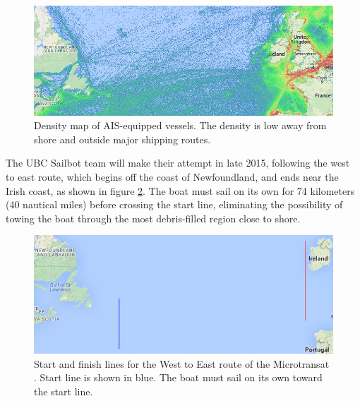 \begin{figure}[H]
\centering
\includegraphics[width=150mm,natwidth=792,natheight=313]{"./image/AIS_density_north_atlantic_3"}
\caption[Instantaneous position of AIS vessels.]{\label{fig:ais-snapshot}Density map of AIS-equipped vessels.  The density is low away from shore and outside major shipping routes.}
\end{figure}

The UBC Sailbot team will make their attempt in late 2015, following the west to east route, which begins off the coast of Newfoundland, and ends near the Irish coast, as shown in figure \ref{fig:w-e_start-finish}. The boat must sail on its own for 74 kilometers (40 nautical miles) before crossing the start line, eliminating the possibility of towing the boat through the most debris-filled region close to shore.

\begin{figure}[H]
\centering
\includegraphics[width=150mm,natwidth=667,natheight=264]{"./image/start-finish_map"}
\caption[Microtransat keypoints.]{\label{fig:w-e_start-finish}Start and finish lines for the West to East route of the Microtransat \cite{transat__w-e_start-finish}. Start line is shown in blue. The boat must sail on its own toward the start line. }
\end{figure}
